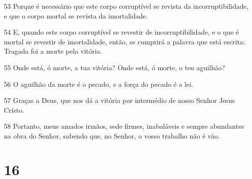 \par 53 Porque é necessário que este corpo corruptível se revista da incorruptibilidade, e que o corpo mortal se revista da imortalidade.
\par 54 E, quando este corpo corruptível se revestir de incorruptibilidade, e o que é mortal se revestir de imortalidade, então, se cumprirá a palavra que está escrita: Tragada foi a morte pela vitória.
\par 55 Onde está, ó morte, a tua vitória? Onde está, ó morte, o teu aguilhão?
\par 56 O aguilhão da morte é o pecado, e a força do pecado é a lei.
\par 57 Graças a Deus, que nos dá a vitória por intermédio de nosso Senhor Jesus Cristo.
\par 58 Portanto, meus amados irmãos, sede firmes, inabaláveis e sempre abundantes na obra do Senhor, sabendo que, no Senhor, o vosso trabalho não é vão.

\chapter{16}


